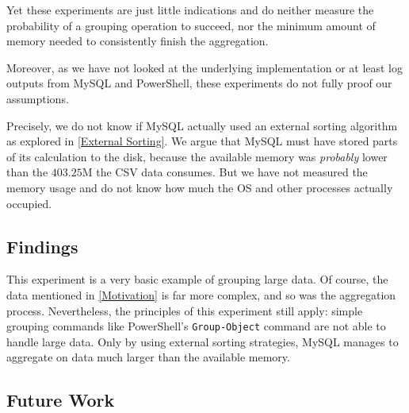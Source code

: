 Yet these experiments are just little indications and do neither measure
the probability of a grouping operation to succeed, nor the minimum amount
of memory needed to consistently finish the aggregation.

Moreover, as we have not looked at the underlying implementation or at least log
outputs from MySQL and PowerShell, these experiments do not fully proof our assumptions.

Precisely, we do not know if MySQL actually used an external sorting algorithm
as explored in \ref{External Sorting}. We argue that MySQL must have stored parts
of its calculation to the disk, because the available memory was \textit{probably}
lower than the $403.25$M the CSV data consumes. But we have not measured
the memory usage and do not know how much the OS and other processes actually occupied.

\subsection{Findings}



This experiment is a very basic example of grouping large data. Of course,
the data mentioned in \ref{Motivation} is far more complex, and so was
the aggregation process. Nevertheless, the principles of this experiment still apply:
simple grouping commands like PowerShell's \verb+Group-Object+ command
are not able to handle large data. Only by using external sorting strategies,
MySQL manages to aggregate on data much larger than the available memory.

\subsection{Future Work}
